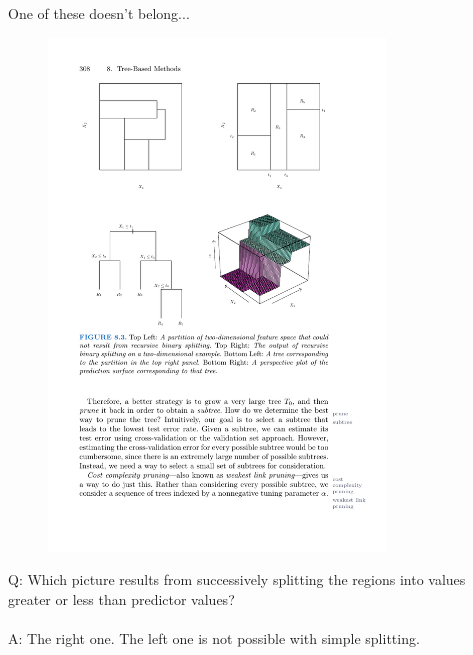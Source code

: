 \documentclass[mathserif, aspectratio=169]{beamer}
\begin{document}
\begin{frame}{One of these doesn't belong...}

\begin{figure}
\includegraphics[width=0.8\textwidth]{partition_examples}
\caption*{}
\end{figure}

\vspace*{-10mm}

Q:  Which picture results from successively splitting the regions into values greater or less than predictor values?\\~\\
\pause
A: The right one.  The left one is not possible with simple splitting.  
\end{frame}
\end{document}
